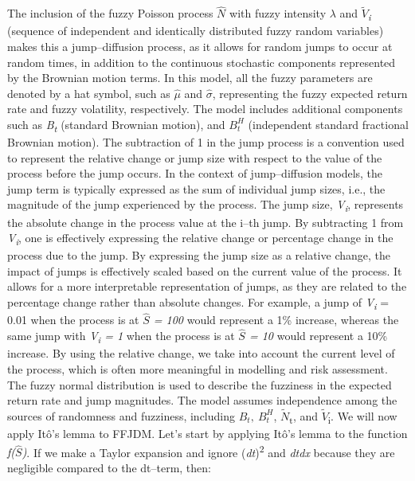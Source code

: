 \documentclass[12pt,a4paper]{report}
\numberwithin{equation}{section}
\begin{document}
The inclusion of the fuzzy Poisson process \emph{$\hat{N}$} with fuzzy intensity
\emph{$\lambda$} and \emph{$\tilde{V}$\textsubscript{i}} (sequence of independent and
identically distributed fuzzy random variables) makes this a
jump--diffusion process, as it allows for random jumps to occur at random
times, in addition to the continuous stochastic components represented
by the Brownian motion terms. In this model, all the fuzzy parameters
are denoted by a hat symbol, such as \(\widehat{\mu}\) and
\(\widehat{\sigma}\), representing the fuzzy expected return rate and
fuzzy volatility, respectively. The model includes additional components
such as \emph{B\textsubscript{t}} (standard Brownian motion), and
\(B_{t}^{H}\) (independent standard fractional Brownian motion). The
subtraction of 1 in the jump process is a convention used to represent
the relative change or jump size with respect to the value of the
process before the jump occurs. In the context of jump--diffusion models,
the jump term is typically expressed as the sum of individual jump
sizes, i.e., the magnitude of the jump experienced by the process. The
jump size, \emph{V\textsubscript{i}}, represents the absolute change in
the process value at the i--th jump. By subtracting 1 from
\emph{V\textsubscript{i}}, one is effectively expressing the relative
change or percentage change in the process due to the jump. By
expressing the jump size as a relative change, the impact of jumps is
effectively scaled based on the current value of the process. It allows
for a more interpretable representation of jumps, as they are related to
the percentage change rather than absolute changes. For example, a jump
of \emph{V\textsubscript{i}} = 0.01 when the process is at \emph{$\hat{S}$ =
100} would represent a 1\% increase, whereas the same jump with
\emph{V\textsubscript{i} = 1} when the process is at \emph{$\hat{S}$ = 10} would
represent a 10\% increase. By using the relative change, we take into
account the current level of the process, which is often more meaningful
in modelling and risk assessment. The fuzzy normal distribution is used
to describe the fuzziness in the expected return rate and jump
magnitudes. The model assumes independence among the sources of
randomness and fuzziness, including \(B_{t},\ B_{t}^{H}\),
$\tilde{N}$\textsubscript{t}, and $\tilde{V}$\textsubscript{i}. We will now apply Itô's
lemma to FFJDM. Let's start by applying Itô's lemma to the function
\emph{f($\hat{S}$)}. If we make a Taylor expansion and ignore
(\emph{dt})\textsuperscript{2} and \emph{dtdx} because they are
negligible compared to the dt--term, then:
\end{document}
